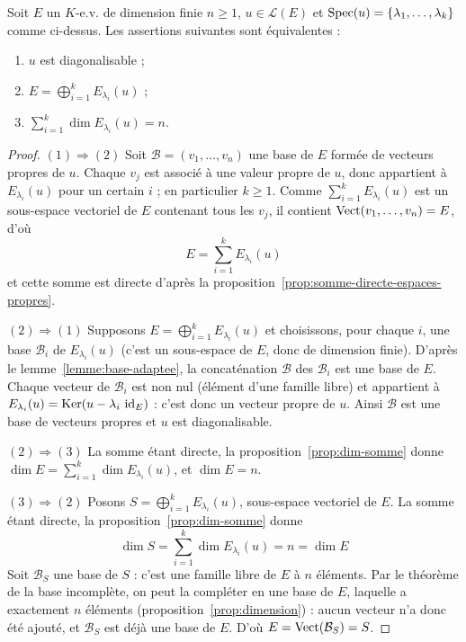 \begin{theo}
\label{theo:caracterisation-diago}
Soit $E$ un $K$-e.v. de dimension finie $n\geq 1$, $u\in\mathcal{L}(E)$ et $\operatorname{Spec}(u)=\{\lambda_1,\dots,\lambda_k\}$ comme ci-dessus. Les assertions suivantes sont équivalentes :
\begin{enumerate}
\item $u$ est diagonalisable ;
\item $E = \displaystyle\bigoplus_{i=1}^{k} E_{\lambda_i}(u)$ ;
\item $\displaystyle\sum_{i=1}^{k} \dim E_{\lambda_i}(u) = n$.
\end{enumerate}
\end{theo}

\begin{proof}
$(1)\Rightarrow(2)$ Soit $\mathcal{B}=(v_1,\dots,v_n)$ une base de $E$ formée de vecteurs propres de $u$. Chaque $v_j$ est associé à une valeur propre de $u$, donc appartient à $E_{\lambda_i}(u)$ pour un certain $i$ ; en particulier $k\geq 1$. Comme $\sum_{i=1}^{k}E_{\lambda_i}(u)$ est un sous-espace vectoriel de $E$ contenant tous les $v_j$, il contient $\operatorname{Vect}(v_1,\dots,v_n)=E$, d'où
\[E = \sum_{i=1}^{k} E_{\lambda_i}(u)\]
et cette somme est directe d'après la proposition~\ref{prop:somme-directe-espaces-propres}.

$(2)\Rightarrow(1)$ Supposons $E=\bigoplus_{i=1}^{k}E_{\lambda_i}(u)$ et choisissons, pour chaque $i$, une base $\mathcal{B}_i$ de $E_{\lambda_i}(u)$ (c'est un sous-espace de $E$, donc de dimension finie). D'après le lemme~\ref{lemme:base-adaptee}, la concaténation $\mathcal{B}$ des $\mathcal{B}_i$ est une base de $E$. Chaque vecteur de $\mathcal{B}_i$ est non nul (élément d'une famille libre) et appartient à $E_{\lambda_i}(u)=\operatorname{Ker}(u-\lambda_i\,\operatorname{id}_E)$ : c'est donc un vecteur propre de $u$. Ainsi $\mathcal{B}$ est une base de vecteurs propres et $u$ est diagonalisable.

$(2)\Rightarrow(3)$ La somme étant directe, la proposition~\ref{prop:dim-somme} donne $\dim E=\sum_{i=1}^{k}\dim E_{\lambda_i}(u)$, et $\dim E=n$.

$(3)\Rightarrow(2)$ Posons $S=\bigoplus_{i=1}^{k}E_{\lambda_i}(u)$, sous-espace vectoriel de $E$. La somme étant directe, la proposition~\ref{prop:dim-somme} donne
\[\dim S = \sum_{i=1}^{k}\dim E_{\lambda_i}(u) = n = \dim E\]
Soit $\mathcal{B}_S$ une base de $S$ : c'est une famille libre de $E$ à $n$ éléments. Par le théorème de la base incomplète, on peut la compléter en une base de $E$, laquelle a exactement $n$ éléments (proposition~\ref{prop:dimension}) : aucun vecteur n'a donc été ajouté, et $\mathcal{B}_S$ est déjà une base de $E$. D'où $E=\operatorname{Vect}(\mathcal{B}_S)=S$.
\end{proof}

